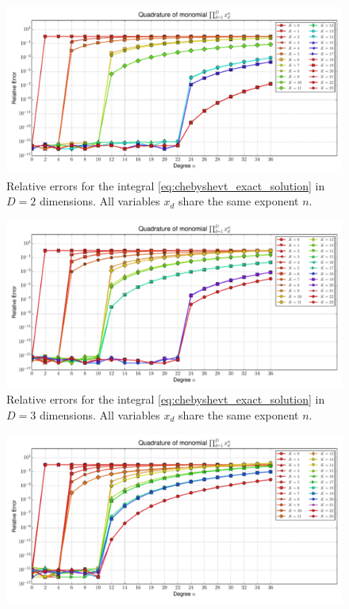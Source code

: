 \documentclass[a4paper,10pt]{article}
\begin{document}
\begin{subfigures}
  \begin{figure}\centering
    \includegraphics[width=\linewidth]{./img/monomial_errors_chebyshevt_multivariate_dimension_2.pdf}
    \caption{Relative errors for the integral \eqref{eq:chebyshevt_exact_solution}
    in $D=2$ dimensions. All variables $x_d$ share the same exponent $n$.}
    \label{fig:monomial_errors_chebyshevt_multivariate_dimension_2}
  \end{figure}
  \begin{figure}\centering
    \includegraphics[width=\linewidth]{./img/monomial_errors_chebyshevt_multivariate_dimension_3.pdf}
    \caption{Relative errors for the integral \eqref{eq:chebyshevt_exact_solution}
    in $D=3$ dimensions. All variables $x_d$ share the same exponent $n$.}
    \label{fig:monomial_errors_chebyshevt_multivariate_dimension_3}
  \end{figure}
  \begin{figure}\centering
    \includegraphics[width=\linewidth]{./img/monomial_errors_chebyshevt_multivariate_dimension_4.pdf}

\end{figure}
\end{subfigures}
\end{document}
